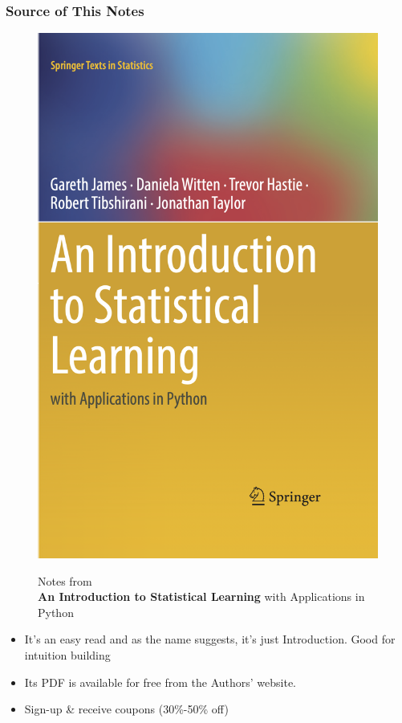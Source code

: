 \documentclass[serif, xcolor={dvipsnames}]{beamer} %
\begin{document}
\begin{frame}[t]
\frametitle{Source of This Notes}

\vspace{-.18in}
\begin{figure}[htbp]
    \centering
    \begin{minipage}{0.3\textwidth}
        \centering
        \includegraphics[width=\linewidth]{ISLP_cover}
    \end{minipage}%
    \hspace{.2in}
    \begin{minipage}{0.5\textwidth}
       Notes from\\ {\bf An Introduction to Statistical Learning} {\tiny with Applications in Python}
    \end{minipage}
\end{figure}

\begin{itemize}
\item It's an easy read and as the name suggests, it's just Introduction. Good for intuition building
\item Its PDF is available for free from the Authors' website.
\item Sign-up \& receive coupons (30\%-50\% off)
\end{itemize}

\end{frame}
\end{document}
